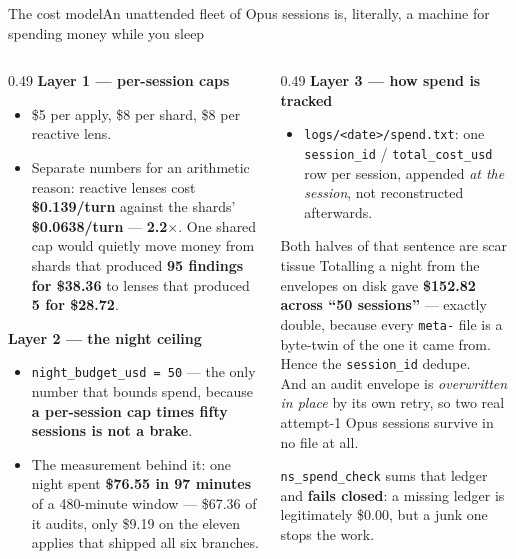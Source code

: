 \documentclass[aspectratio=169,11pt]{beamer}
\newcommand{\warn}[1]{\textcolor{jsWarm}{\textbf{#1}}}
\begin{document}
\begin{frame}{The cost model}{An unattended fleet of Opus sessions is, literally, a machine for spending money while you sleep}
  \scriptsize
  \begin{columns}[T]
    \begin{column}{0.49\textwidth}
      \textbf{Layer 1 --- per-session caps}
      \begin{itemize}
        \item \$5 per apply, \$8 per shard, \$8 per reactive lens.
        \item Separate numbers for an arithmetic reason: reactive lenses cost \textbf{\$0.139/turn} against the shards' \textbf{\$0.0638/turn} --- \textbf{2.2$\times$}. One shared cap would quietly move money from shards that produced \textbf{95 findings for \$38.36} to lenses that produced \textbf{5 for \$28.72}.
      \end{itemize}
      \vspace{0.1em}
      \textbf{Layer 2 --- the night ceiling}
      \begin{itemize}
        \item \texttt{night\_budget\_usd = 50} --- the only number that bounds spend, because \warn{a per-session cap times fifty sessions is not a brake}.
        \item The measurement behind it: one night spent \warn{\$76.55 in 97 minutes} of a 480-minute window --- \$67.36 of it audits, only \$9.19 on the eleven applies that shipped all six branches.
      \end{itemize}
    \end{column}
    \begin{column}{0.49\textwidth}
      \textbf{Layer 3 --- how spend is tracked}
      \begin{itemize}
        \item \texttt{logs/<date>/spend.txt}: one \texttt{session\_id} / \texttt{total\_cost\_usd} row per session, appended \emph{at the session}, not reconstructed afterwards.
      \end{itemize}
      \begin{block}{Both halves of that sentence are scar tissue}
        Totalling a night from the envelopes on disk gave \textbf{\$152.82 across ``50 sessions''} --- exactly double, because every \texttt{meta-} file is a byte-twin of the one it came from. Hence the \texttt{session\_id} dedupe.\\[0.3em]
        And an audit envelope is \emph{overwritten in place} by its own retry, so two real attempt-1 Opus sessions survive in no file at all.
      \end{block}
      \texttt{ns\_spend\_check} sums that ledger and \textbf{fails closed}: a missing ledger is legitimately \$0.00, but a junk one stops the work.
    \end{column}
  \end{columns}
\end{frame}
\end{document}
